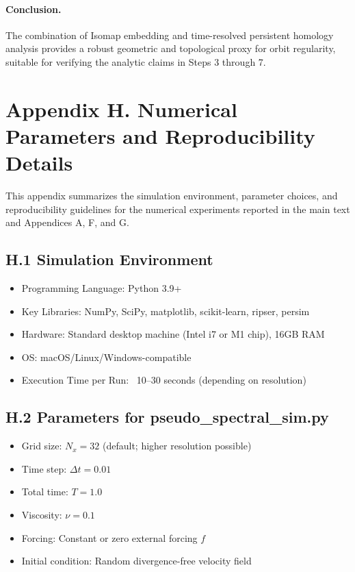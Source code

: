 \documentclass[11pt]{article}
\theoremstyle{definition}
\begin{document}
\paragraph{Conclusion.} The combination of Isomap embedding and time-resolved persistent homology analysis provides a robust geometric and topological proxy for orbit regularity, suitable for verifying the analytic claims in Steps 3 through 7.


\section{Appendix H. Numerical Parameters and Reproducibility Details}
\label{sec:appendixH}

This appendix summarizes the simulation environment, parameter choices, and reproducibility guidelines for the numerical experiments reported in the main text and Appendices A, F, and G.

\subsection*{H.1 Simulation Environment}

\begin{itemize}
  \item Programming Language: Python 3.9+
  \item Key Libraries: NumPy, SciPy, matplotlib, scikit-learn, ripser, persim
  \item Hardware: Standard desktop machine (Intel i7 or M1 chip), 16GB RAM
  \item OS: macOS/Linux/Windows-compatible
  \item Execution Time per Run: ~10–30 seconds (depending on resolution)
\end{itemize}

\subsection*{H.2 Parameters for pseudo\_spectral\_sim.py}

\begin{itemize}
  \item Grid size: \( N_x = 32 \) (default; higher resolution possible)
  \item Time step: \( \Delta t = 0.01 \)
  \item Total time: \( T = 1.0 \)
  \item Viscosity: \( \nu = 0.1 \)
  \item Forcing: Constant or zero external forcing \( f \)
  \item Initial condition: Random divergence-free velocity field
\end{itemize}
\end{document}
